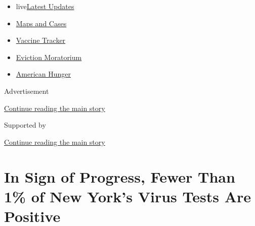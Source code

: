 \begin{itemize}
\tightlist
\item
  live\href{https://www.nytimes3xbfgragh.onion/2020/09/09/world/covid-19-coronavirus.html?name=styln-coronavirus-national\&region=TOP_BANNER\&block=storyline_menu_recirc\&action=click\&pgtype=Article\&impression_id=11146f01-f287-11ea-8c2a-475020e0db7d\&variant=undefined}{Latest
  Updates}
\item
  \href{https://www.nytimes3xbfgragh.onion/interactive/2020/us/coronavirus-us-cases.html?name=styln-coronavirus-national\&region=TOP_BANNER\&block=storyline_menu_recirc\&action=click\&pgtype=Article\&impression_id=11146f02-f287-11ea-8c2a-475020e0db7d\&variant=undefined}{Maps
  and Cases}
\item
  \href{https://www.nytimes3xbfgragh.onion/interactive/2020/science/coronavirus-vaccine-tracker.html?name=styln-coronavirus-national\&region=TOP_BANNER\&block=storyline_menu_recirc\&action=click\&pgtype=Article\&impression_id=11146f03-f287-11ea-8c2a-475020e0db7d\&variant=undefined}{Vaccine
  Tracker}
\item
  \href{https://www.nytimes3xbfgragh.onion/2020/09/02/your-money/eviction-moratorium-covid.html?name=styln-coronavirus-national\&region=TOP_BANNER\&block=storyline_menu_recirc\&action=click\&pgtype=Article\&impression_id=11149610-f287-11ea-8c2a-475020e0db7d\&variant=undefined}{Eviction
  Moratorium}
\item
  \href{https://www.nytimes3xbfgragh.onion/interactive/2020/09/02/magazine/food-insecurity-hunger-us.html?name=styln-coronavirus-national\&region=TOP_BANNER\&block=storyline_menu_recirc\&action=click\&pgtype=Article\&impression_id=11149611-f287-11ea-8c2a-475020e0db7d\&variant=undefined}{American
  Hunger}
\end{itemize}

Advertisement

\protect\hyperlink{after-top}{Continue reading the main story}

Supported by

\protect\hyperlink{after-sponsor}{Continue reading the main story}

\hypertarget{in-sign-of-progress-fewer-than-1-of-new-yorks-virus-tests-are-positive}{%
\section{In Sign of Progress, Fewer Than 1\% of New York's Virus Tests
Are
Positive}\label{in-sign-of-progress-fewer-than-1-of-new-yorks-virus-tests-are-positive}}

